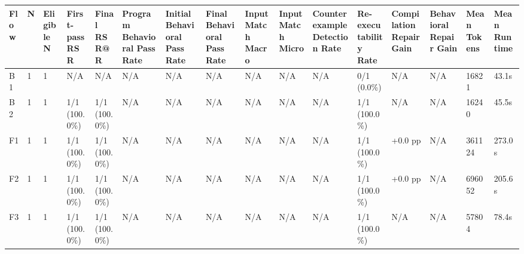 \begin{longtable}{llllllllllllllll}
Flow & N & Eligible N & First-pass RSR & Final RSR@R & Program Behavioral Pass Rate & Initial Behavioral Pass Rate & Final Behavioral Pass Rate & Input Match Macro & Input Match Micro & Counterexample Detection Rate & Re-executability Rate & Compilation Repair Gain & Behavioral Repair Gain & Mean Tokens & Mean Runtime \\ \hline
B1 & 1 & 1 & N/A & N/A & N/A & N/A & N/A & N/A & N/A & N/A & 0/1 (0.0\%) & N/A & N/A & 16821 & 43.1s \\
B2 & 1 & 1 & 1/1 (100.0\%) & 1/1 (100.0\%) & N/A & N/A & N/A & N/A & N/A & N/A & 1/1 (100.0\%) & N/A & N/A & 16240 & 45.5s \\
F1 & 1 & 1 & 1/1 (100.0\%) & 1/1 (100.0\%) & N/A & N/A & N/A & N/A & N/A & N/A & 1/1 (100.0\%) & +0.0 pp & N/A & 361124 & 273.0s \\
F2 & 1 & 1 & 1/1 (100.0\%) & 1/1 (100.0\%) & N/A & N/A & N/A & N/A & N/A & N/A & 1/1 (100.0\%) & +0.0 pp & N/A & 696052 & 205.6s \\
F3 & 1 & 1 & 1/1 (100.0\%) & 1/1 (100.0\%) & N/A & N/A & N/A & N/A & N/A & N/A & 1/1 (100.0\%) & N/A & N/A & 57804 & 78.4s \\
\end{longtable}
